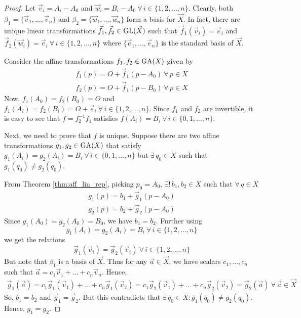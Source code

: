 \begin{proof}
    Let $\vec{v}_i=A_i-A_0$ and $\vec{w}_i=B_i-A_0\ \forall\,i\in\{1,2,\dots,n\}$.
    Clearly, both $\beta_1=\{\vec{v}_1,\dots,\vec{v}_n\}$ and
    $\beta_2=\{\vec{w}_1,\dots,\vec{w}_n\}$ form a basis for $\vec{X}$. In fact,
    there are unique linear transformations $\vec{f}_1,\vec{f}_2\in\operatorname{GL}(\vec{X})$
    such that $\vec{f}_1(\vec{v}_i)=\vec{e}_i$ and
    $\vec{f}_2(\vec{w}_i)=\vec{e}_i\ \forall\,i\in\{1,2,\dots,n\}$ where
    $\{\vec{e}_1,\dots,\vec{e}_n\}$ is the standard basis of $\vec{X}$.
    \vspace{1ex}

    \noindent
    Consider the affine transformations $f_1,f_2\in\operatorname{GA}(X)$ given by
    \begin{align*}
        f_1(p) = O + \vec{f}_1(p-A_0)\ \forall\,p \in X \\
        f_2(p) = O + \vec{f}_1(p-B_0)\ \forall\,p \in X 
    \end{align*}
    Now, $f_1(A_0)=f_2(B_0)=O$ and
    $f_1(A_i)=f_2(B_i)=O+\vec{e}_i\ \forall\,i\in\{1,2,\dots,n\}$. Since $f_1$ and
    $f_2$ are invertible, it is easy to see that $f=f_2^{-1}f_1$ satisfies
    $f(A_i)=B_i\ \forall\,i\in\{0,1,\dots,n\}$.
    \vspace{1ex}

    \noindent
    Next, we need to prove that $f$ is unique. Suppose there are two affine
    transformations $g_1,g_2\in\operatorname{GA}(X)$ that satisfy
    $g_1(A_i)=g_2(A_i)=B_i\ \forall\,i\in\{0,1,\dots,n\}$ but $\exists\,q_0 \in X$
    such that $g_1(q_0) \neq g_2(q_0)$.
    \vspace{1ex}

    \noindent
    From Theorem \ref{thm:aff_lin_rep}, picking $p_0=A_0$,
    $\exists!\,b_1,b_2 \in X$ such that $\forall\,q \in X$
    \begin{align*}
        g_1(p) = b_1 + \vec{g}_1(p-A_0) \\
        g_2(p) = b_2 + \vec{g}_2(p-A_0)
    \end{align*}
    Since $g_1(A_0)=g_2(A_0)=B_0$, we have $b_1=b_2$. Further using
    \[ g_1(A_i)=g_2(A_i)=B_i\ \forall\,i\in\{1,2,\dots,n\} \]
    we get the relations
    \[ \vec{g}_1(\vec{v}_i)=\vec{g}_2(\vec{v}_i)\ \forall\,i\in\{1,2,\dots,n\} \]
    But note that $\beta_1$ is a basis of $\vec{X}$. Thus for any
    $\vec{a}\in\vec{X}$, we have scalars $c_1,\dots,c_n$ such that
    $\vec{a}=c_1\vec{v}_1+\dots+c_n\vec{v}_n$. Hence,
    \begin{align*}
        \vec{g}_1(\vec{a}) = c_1\vec{g}_1(\vec{v}_1)+\dots+c_n\vec{g}_1(\vec{v}_2)
        = c_1\vec{g}_2(\vec{v}_1)+\dots+c_n\vec{g}_2(\vec{v}_2)
        = \vec{g}_2(\vec{a})\ \forall\,\vec{a}\in\vec{X}
    \end{align*}
    So, $b_1=b_2$ and $\vec{g}_1=\vec{g}_2$. But this contradicts that
    $\exists\,q_0 \in X: g_1(q_0) \neq g_2(q_0)$. Hence, $g_1=g_2$.
\end{proof}

